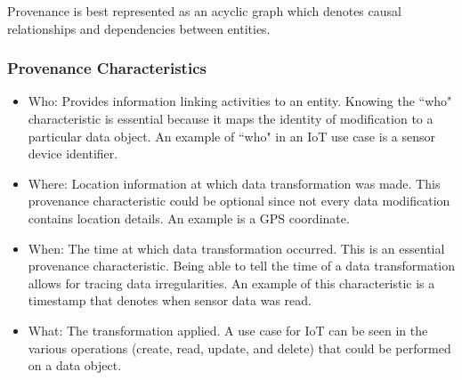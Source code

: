 \documentclass[conference]{IEEEtran}
\begin{document}

Provenance is best represented as an acyclic graph which denotes causal relationships and dependencies between entities. 

 
 \subsubsection{Provenance Characteristics}

\begin{itemize}

\item Who: Provides information linking activities to an entity. Knowing the ``who" characteristic is essential because it maps the identity of modification to a particular data object. An example of ``who" in an IoT use case is a sensor device identifier.

\item Where: Location information at which data transformation was made. This provenance characteristic could be optional since not every data modification contains location details. An example is a GPS coordinate.

\item When: The time at which data transformation occurred. This is an essential provenance characteristic. Being able to tell the time of a data transformation allows for tracing data irregularities. An example of this characteristic is a timestamp that denotes when sensor data was read.

\item What: The transformation applied. A use case for IoT can be seen in the various operations (create, read, update, and delete) that could be performed on a data object.

\end{itemize}



%
\end{document}
